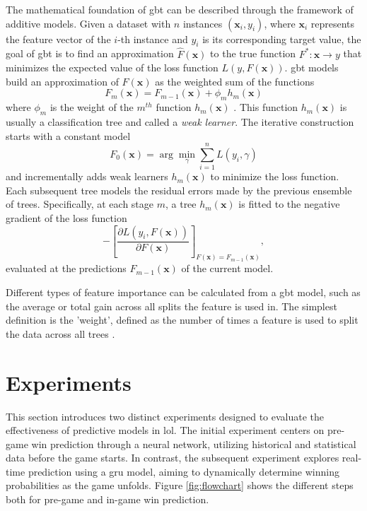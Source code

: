 \documentclass[12pt, a4paper, headinclude, twoside, plainheadsepline, open=right, numbers=noenddot, hidelinks, toc=listof, toc=bibliography]{scrreprt}
\begin{document}
The mathematical foundation of \ac{gbt} can be described through the framework of additive models. 
Given a dataset with $n$ instances $(\mathbf{x}_i, y_i)$, where $\mathbf{x}_i$ represents the feature vector of the $i$-th instance and $y_i$ is its corresponding target value, the goal of \ac{gbt} is to find an approximation $\hat{F}(\mathbf{x})$ to the true function $F^{*}: \mathbf{x} \rightarrow y$ that minimizes the expected value of the loss function $L(y, F(\mathbf{x}))$. 
\Ac{gbt} models build an approximation of $F(\mathbf{x})$ as the weighted sum of the functions
\begin{equation}
F_m(\mathbf{x}) = F_{m-1}(\mathbf{x}) + \phi_m h_m(\mathbf{x})
\end{equation}
where $\phi_m$ is the weight of the $m^{th}$ function $h_m(\mathbf{x})$ \cite{bentejacComparativeAnalysisGradient2021}.
This function $h_m(\mathbf{x})$ is usually a classification tree and called a \textit{weak learner}.
The iterative construction starts with a constant model 
\begin{equation}
F_0(\mathbf{x}) = \arg\min_{\gamma} \sum_{i=1}^{n} L(y_i, \gamma)
\end{equation}
 and incrementally adds weak learners $h_m(\mathbf{x})$ to minimize the loss function. 
Each subsequent tree models the residual errors made by the previous ensemble of trees. Specifically, at each stage $m$, a tree $h_m(\mathbf{x})$ is fitted to the negative gradient of the loss function
\begin{equation}
-\left[\frac{\partial L(y_i, F(\mathbf{x}))}{\partial F(\mathbf{x})}\right]_{F(\mathbf{x})=F_{m-1}(\mathbf{x})},
\end{equation}
evaluated at the predictions $F_{m-1}(\mathbf{x})$ of the current model.

Different types of feature importance can be calculated from a \ac{gbt} model, such as the average or total gain across all splits the feature is used in.
The simplest definition is the 'weight', defined as the number of times a feature is used to split the data across all trees \cite{chenXGBoostScalableTree2016}.

\chapter{Experiments}
\label{chap:experiments}
This section introduces two distinct experiments designed to evaluate the effectiveness of predictive models in \ac{lol}. The initial experiment centers on pre-game win prediction through a neural network, utilizing historical and statistical data before the game starts. In contrast, the subsequent experiment explores real-time prediction using a \ac{gru} model, aiming to dynamically determine winning probabilities as the game unfolds.
Figure \ref{fig:flowchart} shows the different steps both for pre-game and in-game win prediction.
\end{document}
